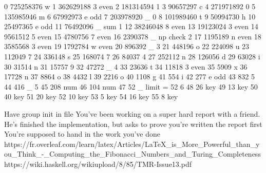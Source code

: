  0 725258376 w
 1 362629188 3 even
 2 181314594 1
 3  90657297 c
 4 271971892 0
 5 135985946 m
 6  67992973 e odd
 7 203978920 _ 0
 8 101989460 t
 9  50994730 h
10  25497365 e odd
11  76492096 _ sum 1
12  38246048 8 even
13  19123024 3 even
14   9561512 5 even
15   4780756 7 even
16   2390378 _ np check 2
17   1195189 n even
18   3585568 3 even
19   1792784 w even
20    896392 _ 3
21    448196 o
22    224098 u
23    112049 7
24    336148 s
25    168074 7
26     84037 4
27    252112 n
28    126056 d
29     63028 i
30     31514 n
31     15757 9
32     47272 _ 4
33     23636 t
34     11818 3 even
35      5909 x
36     17728 n
37      8864 o
38      4432 l
39      2216 o
40      1108 g
41       554 i
42       277 e odd
43       832 5
44       416 _ 5
45       208 num
46       104 num
47        52 _ limit = 52 6
48        26 key
49        13 key
50        40 key
51        20 key
52        10 key
53         5 key
54        16 key
55         8 key


            
Have group init in file
You've been working on a super hard report with a friend. He's finished the implementation, but asks to prove you're written the report first 
You're supposed to hand in the work you've done 
https://fr.overleaf.com/learn/latex/Articles/LaTeX_is_More_Powerful_than_you_Think_-_Computing_the_Fibonacci_Numbers_and_Turing_Completeness
https://wiki.haskell.org/wikiupload/8/85/TMR-Issue13.pdf 


